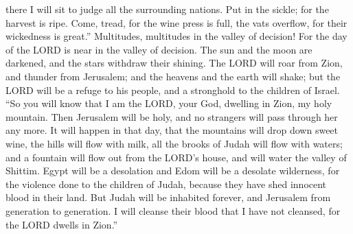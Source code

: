there I will sit to judge all the surrounding nations.  Put
in the sickle; for the harvest is ripe. Come, tread, for the wine press
is full, the vats overflow, for their wickedness is great.''
 Multitudes, multitudes in the valley of decision! For the
day of the LORD is near in the valley of decision.  The sun
and the moon are darkened, and the stars withdraw their shining.
 The LORD will roar from Zion, and thunder from Jerusalem;
and the heavens and the earth will shake; but the LORD will be a refuge
to his people, and a stronghold to the children of Israel. 
``So you will know that I am the LORD, your God, dwelling in Zion, my
holy mountain. Then Jerusalem will be holy, and no strangers will pass
through her any more.  It will happen in that day, that the
mountains will drop down sweet wine, the hills will flow with milk, all
the brooks of Judah will flow with waters; and a fountain will flow out
from the LORD's house, and will water the valley of Shittim.
 Egypt will be a desolation and Edom will be a desolate
wilderness, for the violence done to the children of Judah, because they
have shed innocent blood in their land.  But Judah will be
inhabited forever, and Jerusalem from generation to generation.
 I will cleanse their blood that I have not cleansed, for
the LORD dwells in Zion.''
